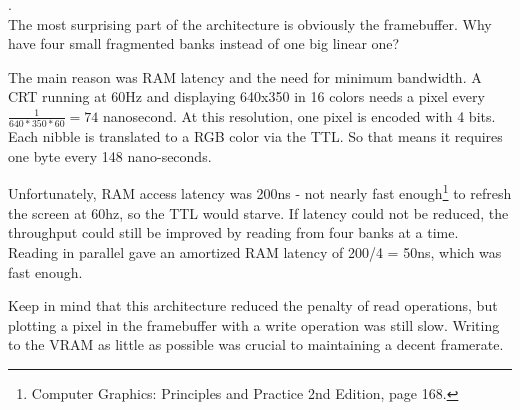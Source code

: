 \documentclass[book.tex]{subfiles}
\begin{document}
\par
{}.\\

The most surprising part of the architecture is obviously the framebuffer. Why have four small fragmented banks instead of one big linear one?\\
\par
The main reason was RAM latency and the need for minimum bandwidth. A CRT running at 60Hz and displaying 640x350 in 16 colors needs a pixel every $\frac{1}{640*350*60}=74$ nanosecond. At this resolution, one pixel is encoded with 4 bits. Each nibble is translated to a RGB color via the TTL. So that means it requires one byte every 148 nano-seconds.\\
\par
 Unfortunately, RAM access latency was 200ns - not nearly fast enough\footnote{Computer Graphics: Principles and Practice 2nd Edition, page 168.} to refresh the screen at 60hz, so the TTL would starve. If latency could not be reduced, the throughput could still be improved by reading from four banks at a time. Reading in parallel gave an amortized RAM latency of 200/4 = 50ns, which was fast enough.\\
\par
Keep in mind that this architecture reduced the penalty of read operations, but plotting a pixel in the framebuffer with a write operation was still slow. Writing to the VRAM as little as possible was crucial to maintaining a decent framerate. 
\end{document}
